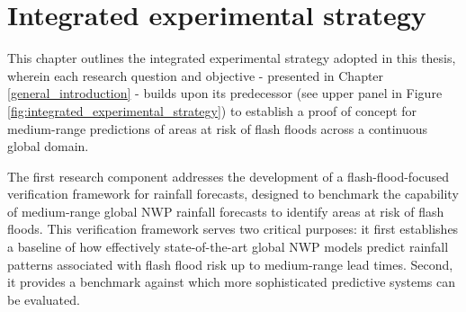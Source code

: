 \chapter{Integrated experimental strategy}
\label{integrated_experimental_strategy}
\graphicspath{{chapter_03/figures}{chapter_03/tables}}


This chapter outlines the integrated experimental strategy adopted in this thesis, wherein each research question and objective - presented in Chapter \ref{general_introduction} - builds upon its predecessor (see upper panel in Figure \ref{fig:integrated_experimental_strategy}) to establish a proof of concept for medium-range predictions of areas at risk of flash floods across a continuous global domain.

The  first research component addresses the development of a flash-flood-focused verification framework for rainfall forecasts, designed to benchmark the capability of medium-range global NWP rainfall forecasts to identify areas at risk of flash floods. This verification framework serves two critical purposes: it first establishes a baseline of how effectively state-of-the-art global NWP models predict rainfall patterns associated with flash flood risk up to medium-range lead times. Second, it provides a benchmark against which more sophisticated predictive systems can be evaluated.

